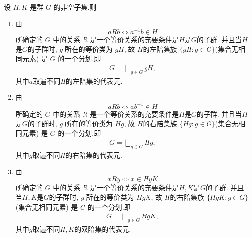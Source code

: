 \documentclass[../../main.tex]{subfiles}%
\begin{document}
\begin{theorem}\label{theorem:抽象代数-定理 1.3.2}
设 \( H ,K\) 是群 \( G \) 的非空子集.则
\begin{enumerate}[(1)]
\item\label{theorem:抽象代数-定理 1.3.2-1} 由
\[
aRb \iff a^{-1}b \in H
\]
所确定的 \( G \) 中的关系 \( R \) 是一个等价关系的充要条件是$H$是$G$的子群. 并且当$H$是$G$的子群时, \( g \) 所在的等价类为 \( gH \), 故 \( H \)的左陪集族 \( \{gH:g\in G\} \)(集合无相同元素) 是 \( G \) 的一个分划.即
\begin{align*}
G = \bigsqcup_{g\in G}gH,
\end{align*}
其中$a$取遍不同$H$的左陪集的代表元.

\item\label{theorem:抽象代数-定理 1.3.2-2} 由
\[
aRb \iff ab^{-1} \in H
\]
所确定的 \( G \) 中的关系 \( R \) 是一个等价关系的充要条件是$H$是$G$的子群. 并且当$H$是$G$的子群时, \( g \) 所在的等价类为 \( Hg \), 故 \( H \)的右陪集族 \( \{Hg:g\in G\} \)(集合无相同元素) 是 \( G \) 的一个分划.即
\begin{align*}
G = \bigsqcup_{g\in G}Hg,
\end{align*}
其中$g$取遍不同$H$的右陪集的代表元.

\item\label{theorem:抽象代数-定理 1.3.2-3} 由
\[
xRy \iff x\in HyK
\]
所确定的 \( G \) 中的关系 \( R \) 是一个等价关系的充要条件是$H,K$是$G$的子群. 并且当$H,K$是$G$的子群时, \( g \) 所在的等价类为 \( HgK \), 故 \( H \)的右陪集族 \( \{HgK:g\in G\} \)(集合无相同元素) 是 \( G \) 的一个分划.即
\begin{align*}
G = \bigsqcup_{g\in G}HgK,
\end{align*}
其中$g$取遍不同$H,K$的双陪集的代表元.
\end{enumerate}
\end{theorem}
\end{document}
